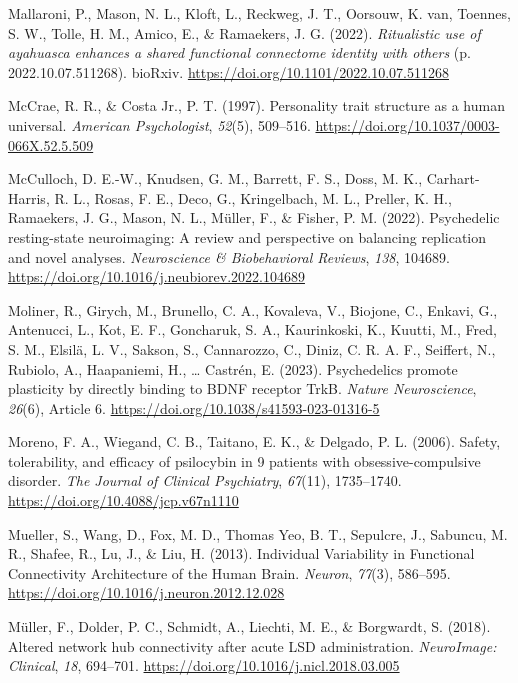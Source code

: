 \begin{CSLReferences}{1}{0}
Mallaroni, P., Mason, N. L., Kloft, L., Reckweg, J. T., Oorsouw, K. van,
Toennes, S. W., Tolle, H. M., Amico, E., \& Ramaekers, J. G. (2022).
\emph{Ritualistic use of ayahuasca enhances a shared functional
connectome identity with others} (p. 2022.10.07.511268). bioRxiv.
\url{https://doi.org/10.1101/2022.10.07.511268}

McCrae, R. R., \& Costa Jr., P. T. (1997). Personality trait structure
as a human universal. \emph{American Psychologist}, \emph{52}(5),
509--516. \url{https://doi.org/10.1037/0003-066X.52.5.509}

McCulloch, D. E.-W., Knudsen, G. M., Barrett, F. S., Doss, M. K.,
Carhart-Harris, R. L., Rosas, F. E., Deco, G., Kringelbach, M. L.,
Preller, K. H., Ramaekers, J. G., Mason, N. L., Müller, F., \& Fisher,
P. M. (2022). Psychedelic resting-state neuroimaging: A review and
perspective on balancing replication and novel analyses.
\emph{Neuroscience \& Biobehavioral Reviews}, \emph{138}, 104689.
\url{https://doi.org/10.1016/j.neubiorev.2022.104689}

Moliner, R., Girych, M., Brunello, C. A., Kovaleva, V., Biojone, C.,
Enkavi, G., Antenucci, L., Kot, E. F., Goncharuk, S. A., Kaurinkoski,
K., Kuutti, M., Fred, S. M., Elsilä, L. V., Sakson, S., Cannarozzo, C.,
Diniz, C. R. A. F., Seiffert, N., Rubiolo, A., Haapaniemi, H., \ldots{}
Castrén, E. (2023). Psychedelics promote plasticity by directly binding
to BDNF receptor TrkB. \emph{Nature Neuroscience}, \emph{26}(6), Article
6. \url{https://doi.org/10.1038/s41593-023-01316-5}

Moreno, F. A., Wiegand, C. B., Taitano, E. K., \& Delgado, P. L. (2006).
Safety, tolerability, and efficacy of psilocybin in 9 patients with
obsessive-compulsive disorder. \emph{The Journal of Clinical
Psychiatry}, \emph{67}(11), 1735--1740.
\url{https://doi.org/10.4088/jcp.v67n1110}

Mueller, S., Wang, D., Fox, M. D., Thomas Yeo, B. T., Sepulcre, J.,
Sabuncu, M. R., Shafee, R., Lu, J., \& Liu, H. (2013). Individual
Variability in Functional Connectivity Architecture of the Human Brain.
\emph{Neuron}, \emph{77}(3), 586--595.
\url{https://doi.org/10.1016/j.neuron.2012.12.028}

Müller, F., Dolder, P. C., Schmidt, A., Liechti, M. E., \& Borgwardt, S.
(2018). Altered network hub connectivity after acute LSD administration.
\emph{NeuroImage: Clinical}, \emph{18}, 694--701.
\url{https://doi.org/10.1016/j.nicl.2018.03.005}


\end{CSLReferences}
